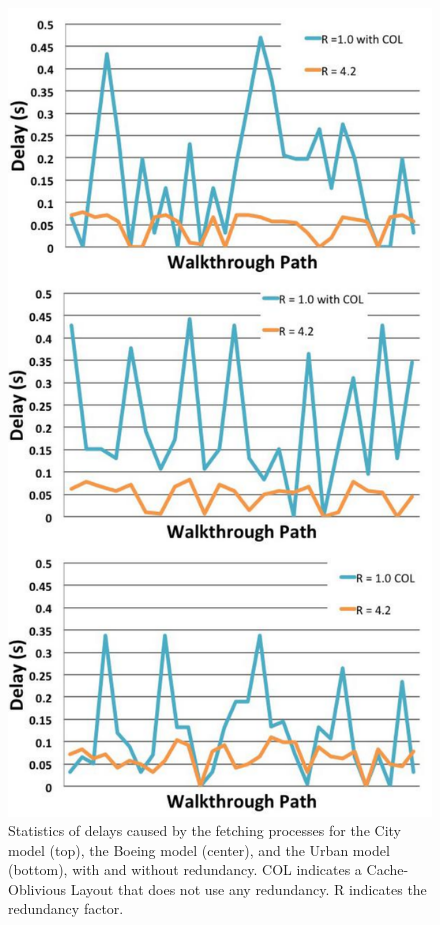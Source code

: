 \begin{figure}[h!]
\centering
\includegraphics[width=\columnwidth]
{comparison_to_COL_all.pdf}
  \caption{Statistics of delays caused by the fetching processes for the City
model (top), the Boeing model (center), and the Urban model (bottom), with and
without redundancy. COL indicates a Cache-Oblivious Layout that does not use any redundancy. R indicates the redundancy factor. }
  \label{fig:resultall}
\end{figure} 

